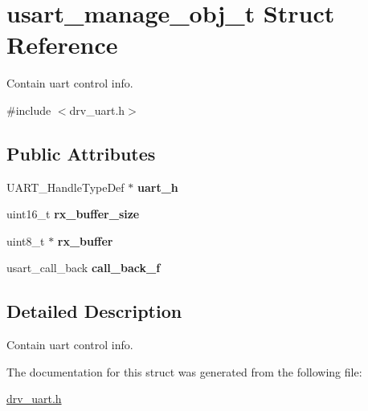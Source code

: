 \hypertarget{structusart__manage__obj__t}{}\section{usart\+\_\+manage\+\_\+obj\+\_\+t Struct Reference}
\label{structusart__manage__obj__t}


Contain uart control info.  




{\ttfamily \#include $<$drv\+\_\+uart.\+h$>$}

\subsection*{Public Attributes}
\begin{DoxyCompactItemize}
\item 
\mbox{\label{structusart__manage__obj__t_af7d66bf84f613e64d434cf2ea870023e}} 
U\+A\+R\+T\+\_\+\+Handle\+Type\+Def $\ast$ {\bfseries uart\+\_\+h}
\item 
\mbox{\label{structusart__manage__obj__t_a3f06c3c1a5e9b8fad8e24558c6939e66}} 
uint16\+\_\+t {\bfseries rx\+\_\+buffer\+\_\+size}
\item 
\mbox{\label{structusart__manage__obj__t_a9f74a0c017fb934292e6e043db4309c7}} 
uint8\+\_\+t $\ast$ {\bfseries rx\+\_\+buffer}
\item 
\mbox{\label{structusart__manage__obj__t_a298811ab3f2071c84ff90fcd7d647af9}} 
usart\+\_\+call\+\_\+back {\bfseries call\+\_\+back\+\_\+f}
\end{DoxyCompactItemize}


\subsection{Detailed Description}
Contain uart control info. 

The documentation for this struct was generated from the following file\+:\begin{DoxyCompactItemize}
\item 
\hyperlink{drv__uart_8h}{drv\+\_\+uart.\+h}\end{DoxyCompactItemize}
